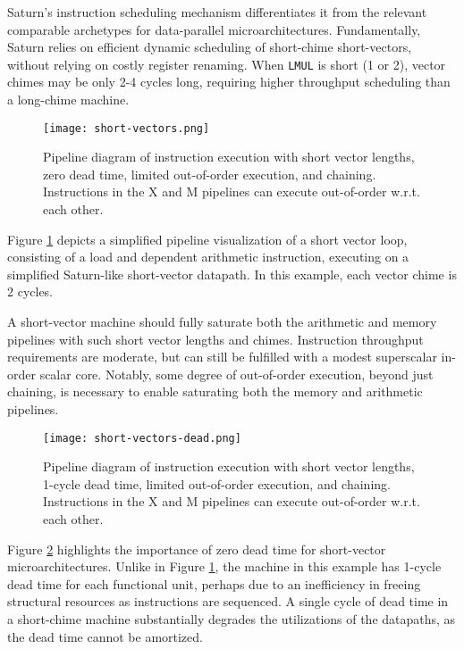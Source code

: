 Saturn's instruction scheduling mechanism differentiates it from the relevant comparable archetypes for data-parallel microarchitectures.
Fundamentally, Saturn relies on efficient dynamic scheduling of short-chime short-vectors, without relying on costly register renaming.
When \texttt{LMUL} is short (1 or 2), vector chimes may be only 2-4 cycles long, requiring higher throughput scheduling than a long-chime machine.

\begin{figure}[h]
  \centering
  \texttt{[image: short-vectors.png]}
  \caption{Pipeline diagram of instruction execution with short vector lengths, zero dead time, limited out-of-order execution, and chaining. Instructions in the X and M pipelines can execute out-of-order w.r.t. each other.}
  \label{fig:short}
\end{figure}

Figure \ref{fig:short} depicts a simplified pipeline visualization of a short vector loop, consisting of a load and dependent arithmetic instruction, executing on a simplified Saturn-like short-vector datapath.
In this example, each vector chime is 2 cycles.


A short-vector machine should fully saturate both the arithmetic and memory pipelines with such short vector lengths and chimes.
Instruction throughput requirements are moderate, but can still be fulfilled with a modest superscalar in-order scalar core.
Notably, some degree of out-of-order execution, beyond just chaining, is necessary to enable saturating both the memory and arithmetic pipelines.

\begin{figure}[h]
  \centering
  \texttt{[image: short-vectors-dead.png]}
  \caption{Pipeline diagram of instruction execution with short vector lengths, 1-cycle dead time, limited out-of-order execution, and chaining. Instructions in the X and M pipelines can execute out-of-order w.r.t. each other.}
  \label{fig:short-dead}
\end{figure}



Figure \ref{fig:short-dead} highlights the importance of zero dead time for short-vector microarchitectures.
Unlike in Figure \ref{fig:short}, the machine in this example has 1-cycle dead time for each functional unit, perhaps due to an inefficiency in freeing structural resources as instructions are sequenced.
A single cycle of dead time in a short-chime machine substantially degrades the utilizations of the datapaths, as the dead time cannot be amortized. 


